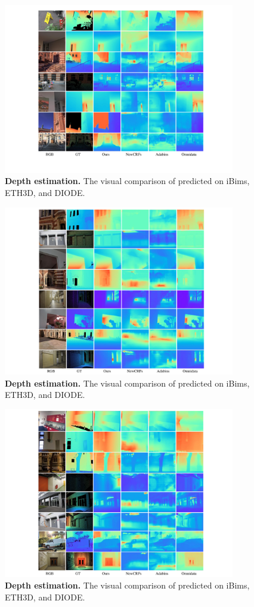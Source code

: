 \begin{figure}[]
\centering
\includegraphics[width=0.9\textwidth]{./files/supp_depth_2.pdf}
\caption{\textbf{Depth estimation.} The visual comparison of predicted on iBims, ETH3D, and DIODE.}
\label{fig: depth_cmp2.}
\end{figure}

\begin{figure}[]
\centering
\includegraphics[width=0.9\textwidth]{./files/supp_depth_3.pdf}
\caption{\textbf{Depth estimation.} The visual comparison of predicted on iBims, ETH3D, and DIODE.}
\label{fig: depth_cmp3.}
\end{figure}

\begin{figure}[]
\centering
\includegraphics[width=0.9\textwidth]{./files/supp_depth_4.pdf}
\caption{\textbf{Depth estimation.} The visual comparison of predicted on iBims, ETH3D, and DIODE.}
\label{fig: depth_cmp4.}
\end{figure}
